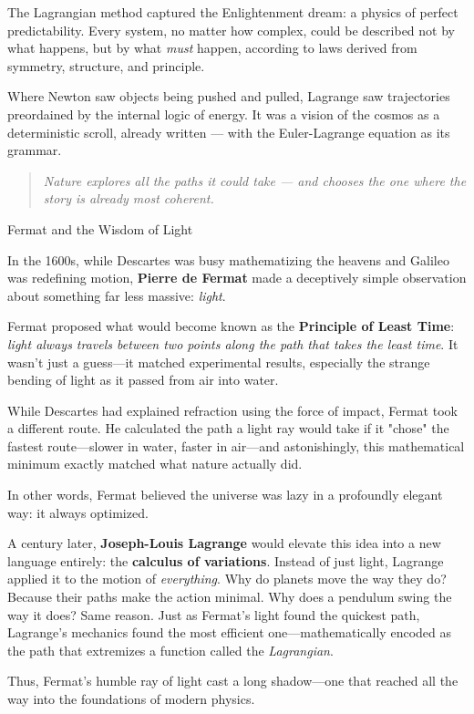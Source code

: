 The Lagrangian method captured the Enlightenment dream: a physics of perfect predictability. Every system, no matter how complex, could be described not by what happens, but by what \textit{must} happen, according to laws derived from symmetry, structure, and principle.

Where Newton saw objects being pushed and pulled, Lagrange saw trajectories preordained by the internal logic of energy. It was a vision of the cosmos as a deterministic scroll, already written — with the Euler-Lagrange equation as its grammar.

\begin{quote}
    \textit{Nature explores all the paths it could take — and chooses the one where the story is already most coherent.}
\end{quote}


\begin{HistoricalSidebar}{Fermat and the Wisdom of Light}

    In the 1600s, while Descartes was busy mathematizing the heavens and Galileo was redefining motion, \textbf{Pierre de Fermat} made a deceptively simple observation about something far less massive: \emph{light}.

    \medskip
    
    Fermat proposed what would become known as the \textbf{Principle of Least Time}: \emph{light always travels between two points along the path that takes the least time}. It wasn’t just a guess—it matched experimental results, especially the strange bending of light as it passed from air into water.

    \medskip
    
    While Descartes had explained refraction using the force of impact, Fermat took a different route. He calculated the path a light ray would take if it "chose" the fastest route—slower in water, faster in air—and astonishingly, this mathematical minimum exactly matched what nature actually did.

    \medskip
    
    In other words, Fermat believed the universe was lazy in a profoundly elegant way: it always optimized.
    
    \medskip
    
    A century later, \textbf{Joseph-Louis Lagrange} would elevate this idea into a new language entirely: the \textbf{calculus of variations}. Instead of just light, Lagrange applied it to the motion of \emph{everything}. Why do planets move the way they do? Because their paths make the action minimal. Why does a pendulum swing the way it does? Same reason. Just as Fermat’s light found the quickest path, Lagrange’s mechanics found the most efficient one—mathematically encoded as the path that extremizes a function called the \textit{Lagrangian}.

    \medskip
    
    Thus, Fermat’s humble ray of light cast a long shadow—one that reached all the way into the foundations of modern physics.
    
\end{HistoricalSidebar}

